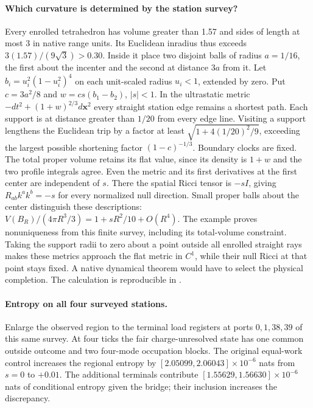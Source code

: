 \paragraph{Which curvature is determined by the station survey?}
Every enrolled tetrahedron has volume greater than 1.57 and sides of
length at most 3 in native range units. Its Euclidean inradius thus
exceeds $3(1.57)/(9\sqrt 3)>0.30$. Inside it place two disjoint balls
of radius $a=1/16$, the first about the incenter and the second at distance $3a$ from it. Let $b_i=u_i^2(1-u_i^2)^4$ on each unit-scaled
radius $u_i<1$, extended by zero. Put $c=3a^2/8$ and
$w=cs(b_1-b_2)$, $|s|<1$. In the ultrastatic metric
$-dt^2+(1+w)^{2/3}d\mathbf{x}^2$ every straight station edge remains
a shortest path. Each support is at distance greater than $1/20$
from every edge line. Visiting a support lengthens the Euclidean trip
by a factor at least $\sqrt{1+4(1/20)^2/9}$, exceeding the largest
possible shortening factor $(1-c)^{-1/3}$. Boundary clocks are fixed.
The total proper volume retains its flat value, since its density
is $1+w$ and the two profile integrals agree. Even the metric and
its first derivatives at the first center are independent of $s$.
There the spatial Ricci tensor is $-sI$, giving
$R_{ab}k^ak^b=-s$ for every normalized null direction.
Small proper balls about the center distinguish these descriptions:
$V(B_R)/(4\pi R^3/3)=1+sR^2/10+O(R^4)$.
The example proves nonuniqueness from this finite survey, including
its total-volume constraint. Taking the support radii to zero about a point outside all enrolled straight rays makes these metrics approach the flat metric in $C^1$, while their null Ricci at that point stays fixed. A native dynamical theorem would have
to select the physical completion. The calculation is reproducible
in .

\paragraph{Entropy on all four surveyed stations.}
Enlarge the observed region to the terminal load registers at ports
$0,1,38,39$ of this same survey. At four ticks the fair charge-unresolved
state has one common outside outcome and two four-mode occupation blocks.
The original equal-work control increases the regional entropy by
$[2.05099,2.06043]\times10^{-6}$ nats from $s=0$ to $+0.01$.
The additional terminals contribute
$[1.55629,1.56630]\times10^{-6}$ nats of conditional entropy given
the bridge; their inclusion increases the discrepancy.

